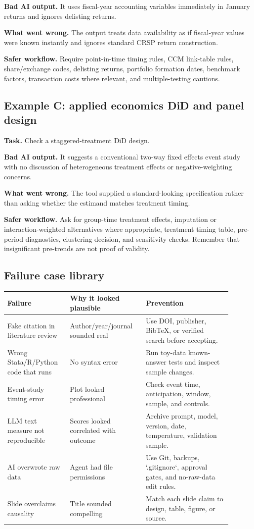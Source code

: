 \documentclass[11pt]{article}
\begin{document}
\textbf{Bad AI output.} It uses fiscal-year accounting variables immediately in January returns and ignores delisting returns.

\textbf{What went wrong.} The output treats data availability as if fiscal-year values were known instantly and ignores standard CRSP return construction.

\textbf{Safer workflow.} Require point-in-time timing rules, CCM link-table rules, share/exchange codes, delisting returns, portfolio formation dates, benchmark factors, transaction costs where relevant, and multiple-testing cautions.

\subsection{Example C: applied economics DiD and panel design}

\textbf{Task.} Check a staggered-treatment DiD design.

\textbf{Bad AI output.} It suggests a conventional two-way fixed effects event study with no discussion of heterogeneous treatment effects or negative-weighting concerns.

\textbf{What went wrong.} The tool supplied a standard-looking specification rather than asking whether the estimand matches treatment timing.

\textbf{Safer workflow.} Ask for group-time treatment effects, imputation or interaction-weighted alternatives where appropriate, treatment timing table, pre-period diagnostics, clustering decision, and sensitivity checks. Remember that insignificant pre-trends are not proof of validity.

\subsection{Failure case library}

\begin{longtable}{p{0.25\linewidth}p{0.30\linewidth}p{0.35\linewidth}}
\toprule
\textbf{Failure} & \textbf{Why it looked plausible} & \textbf{Prevention}\\
\midrule
Fake citation in literature review & Author/year/journal sounded real & Use DOI, publisher, BibTeX, or verified search before accepting.\\
Wrong Stata/R/Python code that runs & No syntax error & Run toy-data known-answer tests and inspect sample changes.\\
Event-study timing error & Plot looked professional & Check event time, anticipation, window, sample, and controls.\\
LLM text measure not reproducible & Scores looked correlated with outcome & Archive prompt, model, version, date, temperature, validation sample.\\
AI overwrote raw data & Agent had file permissions & Use Git, backups, `.gitignore`, approval gates, and no-raw-data edit rules.\\
Slide overclaims causality & Title sounded compelling & Match each slide claim to design, table, figure, or source.\\
\bottomrule
\end{longtable}
\end{document}
